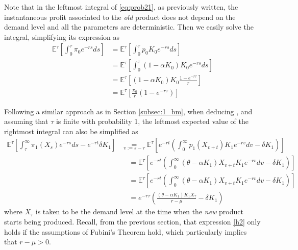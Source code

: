 Note that in the leftmost integral of \eqref{eq:prob21}, as previously written, the instantaneous profit associated to the \textit{old} product does not depend on the demand level and all the parameters are deterministic. Then we easily solve the integral, simplifying its expression as
\begin{align}
\mathds{E}^{\tau} \left[\int_0^\tau \pi_0e^{-rs} ds \right] 
&= \mathds{E}^{\tau} \left[ \int_0^\tau p_0K_0e^{-rs} ds \right] \nonumber \\
&= \mathds{E}^{\tau} \left[ \int_0^\tau (1-\alpha K_0) K_0e^{-rs} ds \right] \nonumber \\
&= \mathds{E}^{\tau} \left[ (1-\alpha K_0) K_0 \frac{1-e^{-r \tau}}{r} \right] \nonumber\\
&= \mathds{E}^{\tau} \left[ \frac{\pi_0}{r} (1-e^{-r \tau}) \right]
\label{g2}
\end{align}

Following a similar approach as in Section \ref{subsec:1_bm}, when deducing , and assuming that $\tau$ is finite with probability 1, the leftmost expected value of the rightmost integral can also be simplified as
\begin{align}
\mathds{E}^{\tau} \left[  \int_\tau^\infty \pi_1(X_s)e^{-rs} ds -e^{-rt}\delta K_1 \right]
&\underset{v:=s-\tau}{=}  \mathds{E}^{\tau} \left[  e^{-rt} \left( \int_0^\infty p_1(X_{v+t}) K_1e^{-rv} dv -\delta K_1 \right) \right] \nonumber \\
& \quad = \mathds{E}^{\tau} \left[ e^{-rt} \left( \int_0^\infty (\theta-\alpha K_1)X_{v+t} K_1e^{-rv} dv -\delta K_1 \right) \right] \nonumber \\
& \quad = \mathds{E}^{\tau} \left[ e^{-rt} \left( \int_0^\infty (\theta-\alpha K_1)X_{v+t} K_1e^{-rv} dv -\delta K_1 \right) \right] \nonumber \\
& \quad = e^{-r\tau} \left( \frac{(\theta-\alpha K_1)K_1 X_\tau}{r-\mu} -\delta K_1 \right)
\label{h2}
\end{align}
where $X_\tau$ is taken to be the demand level at the time when the \textit{new} product starts being produced. Recall, from the previous section, that expression \eqref{h2} only holds if the assumptions of Fubini's Theorem hold, which particularly implies that $r-\mu>0$.

